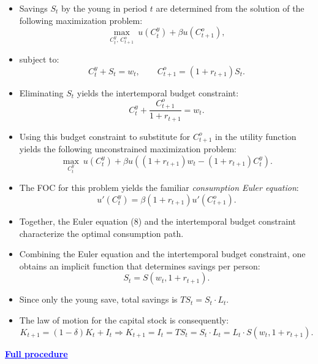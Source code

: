 \documentclass[12pt]{article}
\begin{document}
\begin{itemize}
    \item Savings $S_t$ by the young in period $t$ are determined from the solution of the following maximization problem:
    \[
    \max_{C_t^y,\, C_{t+1}^o} \ u(C_t^y) + \beta u(C_{t+1}^o),
    \]
    \item subject to:
    \[
    C_t^y + S_t = w_t,
    \qquad
    C_{t+1}^o = (1 + r_{t+1}) S_t.
    \]
    
    \item Eliminating $S_t$ yields the intertemporal budget constraint:
    \[
    C_t^y + \frac{C_{t+1}^o}{1 + r_{t+1}} = w_t.
    \]
    
    \item Using this budget constraint to substitute for $C_{t+1}^o$ in the utility function yields the following unconstrained maximization problem:
    \[
    \max_{C_t^y} \ u(C_t^y) + \beta u\left((1 + r_{t+1}) w_t - (1 + r_{t+1}) C_t^y\right).
    \]
    
    \item The FOC for this problem yields the familiar \textit{consumption Euler equation}:
    \[
    u'(C_t^y) = \beta (1 + r_{t+1}) u'(C_{t+1}^o). \tag{8}
    \]
    
    \item Together, the Euler equation (8) and the intertemporal budget constraint characterize the optimal consumption path.
    
    \item Combining the Euler equation and the intertemporal budget constraint, one obtains an implicit function that determines savings per person:
    \[
    S_t = S(w_t, 1 + r_{t+1}). \tag{9}
    \]
    
    \item Since only the young save, total savings is $T S_t = S_t \cdot L_t$.
    
    \item The law of motion for the capital stock is consequently:
    \[
    K_{t+1} = (1 - \delta) K_t + I_t
    \Rightarrow
    K_{t+1} = I_t = T S_t = S_t \cdot L_t = L_t \cdot S(w_t, 1 + r_{t+1}). \tag{10}
    \]
\end{itemize}

\textcolor{blue}{\textbf{\uline{Full procedure}}}
\end{document}
